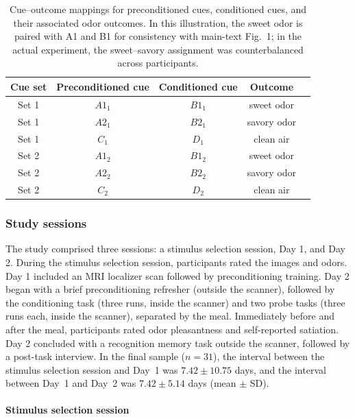 \documentclass[9pt,twoside,lineno]{pnas-new}
\begin{document}
\begin{table}[!htbp]
\centering
\caption{Cue–outcome mappings for preconditioned cues, conditioned cues, and their associated odor outcomes.
In this illustration, the sweet odor is paired with A1 and B1 for consistency with main-text Fig.~1;
in the actual experiment, the sweet–savory assignment was counterbalanced across participants.
}
\label{tab:cue-mapping}
\begin{tabular}{ccccc}
\hline
\textbf{Cue set} & \textbf{Preconditioned cue} & \textbf{Conditioned cue} & \textbf{Outcome} \\
\hline
Set 1 & $A1_{1}$ & $B1_{1}$ & sweet odor \\
Set 1 & $A2_{1}$ & $B2_{1}$ & savory odor \\
Set 1 & $C_{1}$ & $D_{1}$ & clean air \\
Set 2 & $A1_{2}$ & $B1_{2}$ & sweet odor \\
Set 2 & $A2_{2}$ & $B2_{2}$ & savory odor \\
Set 2 & $C_{2}$ & $D_{2}$ & clean air \\
\hline
\end{tabular}
\end{table}

\subsubsection*{Study sessions}

The study comprised three sessions: a stimulus selection session, Day 1, and Day 2. During the stimulus selection session, participants rated the images and odors. Day 1 included an MRI localizer scan followed by preconditioning training. Day 2 began with a brief preconditioning refresher (outside the scanner), followed by the conditioning task (three runs, inside the scanner) and two probe tasks (three runs each, inside the scanner), separated by the meal. Immediately before and after the meal, participants rated odor pleasantness and self-reported satiation. Day 2 concluded with a recognition memory task outside the scanner, followed by a post-task interview. In the final sample ($n = 31$), the interval between the stimulus selection session and Day~1 was \(7.42 \pm 10.75\) days, and the interval between Day~1 and Day~2 was \(7.42 \pm 5.14\) days (mean $\pm$ SD).

\paragraph*{Stimulus selection session}
\end{document}
